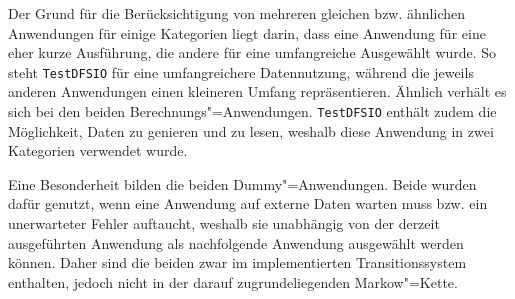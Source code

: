 Der Grund für die Berücksichtigung von mehreren gleichen bzw. ähnlichen Anwendungen für einige Kategorien liegt darin, dass eine Anwendung für eine eher kurze Ausführung, die andere für eine umfangreiche Ausgewählt wurde. So steht \texttt{TestDFSIO} für eine umfangreichere Datennutzung, während die jeweils anderen Anwendungen einen kleineren Umfang repräsentieren. Ähnlich verhält es sich bei den beiden Berechnungs"=Anwendungen. \texttt{TestDFSIO} enthält zudem die Möglichkeit, Daten zu genieren und zu lesen, weshalb diese Anwendung in zwei Kategorien verwendet wurde.

Eine Besonderheit bilden die beiden Dummy"=Anwendungen. Beide wurden dafür genutzt, wenn eine Anwendung auf externe Daten warten muss bzw. ein unerwarteter Fehler auftaucht, weshalb sie unabhängig von der derzeit ausgeführten Anwendung als nachfolgende Anwendung ausgewählt werden können. Daher sind die beiden zwar im implementierten Transitionssystem enthalten, jedoch nicht in der darauf zugrundeliegenden Markow"=Kette.

